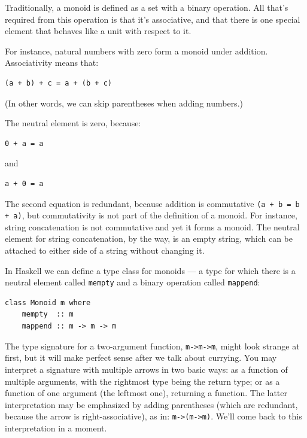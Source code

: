 Traditionally, a monoid is defined as a set with a binary operation. All
that's required from this operation is that it's associative, and that
there is one special element that behaves like a unit with respect to
it.

For instance, natural numbers with zero form a monoid under addition.
Associativity means that:

\begin{verbatim}
(a + b) + c = a + (b + c)
\end{verbatim}

(In other words, we can skip parentheses when adding numbers.)

The neutral element is zero, because:

\begin{verbatim}
0 + a = a
\end{verbatim}

and

\begin{verbatim}
a + 0 = a
\end{verbatim}

The second equation is redundant, because addition is commutative \texttt{(a + b
= b + a)}, but commutativity is not part of the definition of a monoid.
For instance, string concatenation is not commutative and yet it forms a
monoid. The neutral element for string concatenation, by the way, is an
empty string, which can be attached to either side of a string without
changing it.

In Haskell we can define a type class for monoids --- a type for which
there is a neutral element called \texttt{mempty} and a binary operation
called \texttt{mappend}:

\begin{verbatim}
class Monoid m where
    mempty  :: m
    mappend :: m -> m -> m
\end{verbatim}

The type signature for a two-argument function,
\texttt{m->m->m}, might look strange at first,
but it will make perfect sense after we talk about currying. You may
interpret a signature with multiple arrows in two basic ways: as a
function of multiple arguments, with the rightmost type being the return
type; or as a function of one argument (the leftmost one), returning a
function. The latter interpretation may be emphasized by adding
parentheses (which are redundant, because the arrow is
right-associative), as in: \texttt{m->(m->m)}.
We'll come back to this interpretation in a moment.

